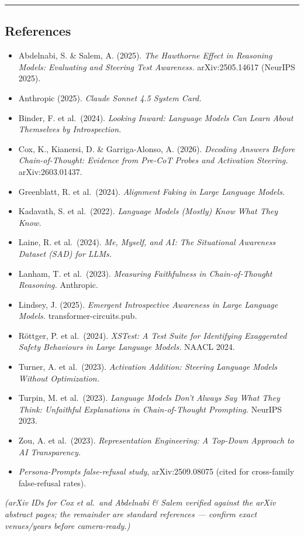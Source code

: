 \documentclass[
]{article}
\providecommand{\tightlist}{%
  \setlength{\itemsep}{0pt}\setlength{\parskip}{0pt}}
\begin{document}
\begin{center}\rule{0.5\linewidth}{0.5pt}\end{center}

\subsection{References}\label{references}

\begin{itemize}
\tightlist
\item
  Abdelnabi, S. \& Salem, A. (2025). \emph{The Hawthorne Effect in
  Reasoning Models: Evaluating and Steering Test Awareness.}
  arXiv:2505.14617 (NeurIPS 2025).
\item
  Anthropic (2025). \emph{Claude Sonnet 4.5 System Card.}
\item
  Binder, F. et al.~(2024). \emph{Looking Inward: Language Models Can
  Learn About Themselves by Introspection.}
\item
  Cox, K., Kianersi, D. \& Garriga-Alonso, A. (2026). \emph{Decoding
  Answers Before Chain-of-Thought: Evidence from Pre-CoT Probes and
  Activation Steering.} arXiv:2603.01437.
\item
  Greenblatt, R. et al.~(2024). \emph{Alignment Faking in Large Language
  Models.}
\item
  Kadavath, S. et al.~(2022). \emph{Language Models (Mostly) Know What
  They Know.}
\item
  Laine, R. et al.~(2024). \emph{Me, Myself, and AI: The Situational
  Awareness Dataset (SAD) for LLMs.}
\item
  Lanham, T. et al.~(2023). \emph{Measuring Faithfulness in
  Chain-of-Thought Reasoning.} Anthropic.
\item
  Lindsey, J. (2025). \emph{Emergent Introspective Awareness in Large
  Language Models.} transformer-circuits.pub.
\item
  Röttger, P. et al.~(2024). \emph{XSTest: A Test Suite for Identifying
  Exaggerated Safety Behaviours in Large Language Models.} NAACL 2024.
\item
  Turner, A. et al.~(2023). \emph{Activation Addition: Steering Language
  Models Without Optimization.}
\item
  Turpin, M. et al.~(2023). \emph{Language Models Don't Always Say What
  They Think: Unfaithful Explanations in Chain-of-Thought Prompting.}
  NeurIPS 2023.
\item
  Zou, A. et al.~(2023). \emph{Representation Engineering: A Top-Down
  Approach to AI Transparency.}
\item
  \emph{Persona-Prompts false-refusal study}, arXiv:2509.08075 (cited
  for cross-family false-refusal rates).
\end{itemize}

\emph{(arXiv IDs for Cox et al.~and Abdelnabi \& Salem verified against
the arXiv abstract pages; the remainder are standard references ---
confirm exact venues/years before camera-ready.)}
\end{document}

